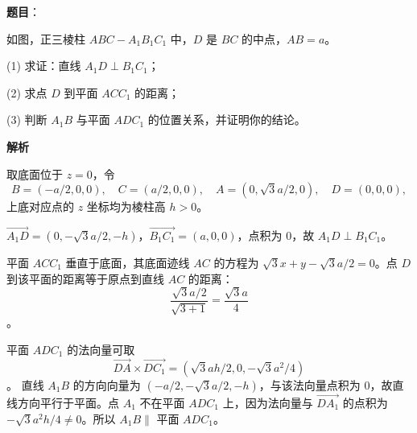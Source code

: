 \begin{answer}

\textbf{题目}：

如图，正三棱柱 \(ABC-A_1B_1C_1\) 中，\(D\) 是 \(BC\) 的中点，\(AB=a\)。

(1) 求证：直线 \(A_1D\perp B_1C_1\)；

(2) 求点 \(D\) 到平面 \(ACC_1\) 的距离；

(3) 判断 \(A_1B\) 与平面 \(ADC_1\) 的位置关系，并证明你的结论。
\nopagebreak[4]
\begin{center}\end{center}
\nopagebreak[4]
\textbf{解析}

取底面位于 \(z=0\)，令
\nopagebreak[4]
\[
B=(-a/2,0,0),\quad C=(a/2,0,0),\quad A=(0,\sqrt3a/2,0),\quad D=(0,0,0),
\]
上底对应点的 \(z\) 坐标均为棱柱高 \(h>0\)。


\(\overrightarrow{A_1D}=(0,-\sqrt3a/2,-h)\)，\(\overrightarrow{B_1C_1}=(a,0,0)\)，点积为 0，故 \(A_1D\perp B_1C_1\)。


平面 \(ACC_1\) 垂直于底面，其底面迹线 \(AC\) 的方程为 \(\sqrt3x+y-\sqrt3a/2=0\)。点 \(D\) 到该平面的距离等于原点到直线 \(AC\) 的距离：
\nopagebreak[4]
\[
\frac{\sqrt3a/2}{\sqrt{3+1}}=\frac{\sqrt3a}{4}
\]
。


平面 \(ADC_1\) 的法向量可取
\nopagebreak[4]
\[
\overrightarrow{DA}\times\overrightarrow{DC_1}=(\sqrt3ah/2,0,-\sqrt3a^2/4)
\]
。
直线 \(A_1B\) 的方向向量为 \((-a/2,-\sqrt3a/2,-h)\)，与该法向量点积为 0，故直线方向平行于平面。点 \(A_1\) 不在平面 \(ADC_1\) 上，因为法向量与 \(\overrightarrow{DA_1}\) 的点积为 \(-\sqrt3a^2h/4\ne0\)。所以 \(A_1B\parallel\) 平面 \(ADC_1\)。




\end{answer}
